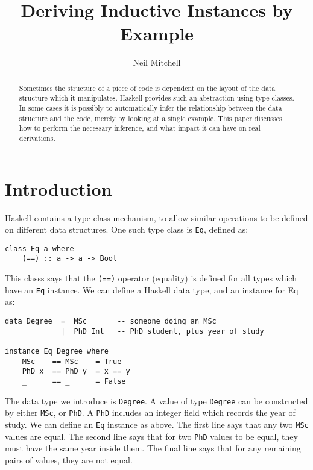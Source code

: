 \documentclass{llncs}
\newcommand{\T}[1]{\texttt{#1}}
\begin{document}
\title{Deriving Inductive Instances by Example}
\author{Neil Mitchell}


\maketitle

\begin{abstract}
Sometimes the structure of a piece of code is dependent on the layout of the data structure which it manipulates. Haskell provides such an abstraction using type-classes. In some cases it is possibly to automatically infer the relationship between the data structure and the code, merely by looking at a single example. This paper discusses how to perform the necessary inference, and what impact it can have on real derivations.
\end{abstract}

\section{Introduction}

Haskell contains a type-class mechanism, to allow similar operations to be defined on different data structures. One such type class is \T{Eq}, defined as:

\begin{verbatim}
class Eq a where
    (==) :: a -> a -> Bool
\end{verbatim}

This classs says that the \T{(==)} operator (equality) is defined for all types which have an \T{Eq} instance. We can define a Haskell data type, and an instance for Eq as:

\begin{verbatim}
data Degree  =  MSc       -- someone doing an MSc
             |  PhD Int   -- PhD student, plus year of study

instance Eq Degree where
    MSc    == MSc    = True
    PhD x  == PhD y  = x == y
    _      == _      = False
\end{verbatim}

The data type we introduce is \T{Degree}. A value of type \T{Degree} can be constructed by either \T{MSc}, or \T{PhD}. A \T{PhD} includes an integer field which records the year of study. We can define an \T{Eq} instance as above. The first line says that any two \T{MSc} values are equal. The second line says that for two \T{PhD} values to be equal, they must have the same year inside them. The final line says that for any remaining pairs of values, they are not equal.
\end{document}
